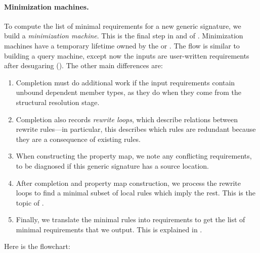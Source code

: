\documentclass[../generics]{subfiles}
\begin{document}
\paragraph{Minimization machines.}
To compute the list of minimal requirements for a new generic signature, we build a \emph{minimization machine}. This is the final step in  and  of . Minimization machines have a temporary lifetime owned by the  or . The flow is similar to building a query machine, except now the inputs are user-written requirements after desugaring (). The other main differences are:
\begin{enumerate}
\item Completion must do additional work if the input requirements contain unbound dependent member types, as they do when they come from the structural resolution stage.
\item Completion also records \emph{rewrite loops}, which describe relations between rewrite rules---in particular, this describes which rules are redundant because they are a consequence of existing rules.
\item When constructing the property map, we note any conflicting requirements, to be diagnosed if this generic signature has a source location.
\item After completion and property map construction, we process the rewrite loops to find a minimal subset of local rules which imply the rest. This is the topic of .
\item Finally, we translate the minimal rules into requirements to get the list of minimal requirements that we output. This is explained in .
\end{enumerate}
Here is the flowchart:
\end{document}
